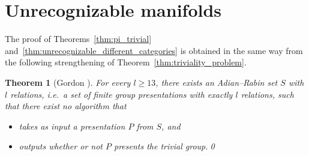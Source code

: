 \documentclass[a4paper, reqno]{amsart}
\newtheorem{theorem}[proposition]{Theorem}
\theoremstyle{definition}
\theoremstyle{remark}
\newcommand{\N}{\mathbb{N}}
\renewcommand{\~}{\nobreak\ }
\begin{document}
\section{Unrecognizable manifolds}\label{sec:unrecognizable}

The proof of Theorems\~\ref{thm:pi_trivial} and\~\ref{thm:unrecognizable_different_categories} is obtained in the same way from the following strengthening of Theorem\~\ref{thm:triviality_problem}.

\begin{theorem}[Gordon {\cite[Theorem 2.2]{Gordon}}] \label{thm:Adian_Rabin_set}
For every $l\geq13$, there exists an \emph{Adian--Rabin set} $S$ with $l$ relations, i.e.\ a set of finite group presentations with exactly $l$ relations, such that there exist no algorithm that
\begin{itemize}
    \item takes as input a presentation $P$ from $S$, and
    \item outputs whether or not $P$ presents the trivial group.\qed
\end{itemize}
\end{theorem}

\end{document}
